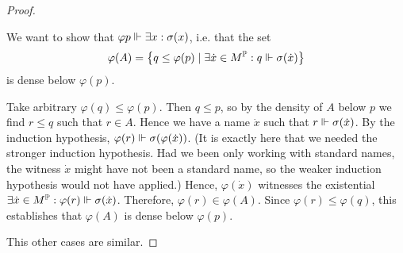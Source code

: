 \documentclass[11pt]{article}
\renewcommand{\P}{\mathbb{P}}
\renewcommand{\phi}{\varphi}
\begin{document}
\begin{proof}
\begin{description}
            We want to show that
            $\phi p \forces \exists x : \sigma(x)$,
            i.e. that the set
            \begin{equation*}
                \phi(A) = \setof{
                    q \leq \phi(p) \sth
                    \exists \dot x \in M^\P :
                    q \forces \sigma(\dot x)
                }
            \end{equation*}
            is dense below $\phi(p)$.

            Take arbitrary $\phi(q) \leq \phi(p)$.
            Then $q \leq p$, so by the density of $A$ below $p$ we find
            $r \leq q$ such that $r \in A$. Hence we have a name $\dot x$ such
            that $r \Vdash \sigma(\dot x)$.
            By the induction hypothesis,
            $\phi(r) \forces \sigma(\phi(\dot x))$.
            (It is exactly here that we needed the stronger induction
            hypothesis.
            Had we been only working with standard names, the witness $\dot x$
            might have not been a standard name, so the weaker induction
            hypothesis would not have applied.)
            Hence, $\phi(\dot x)$ witnesses the existential
            $\exists \dot x \in M^\P : \phi(r) \forces \sigma(\dot x)$.
            Therefore, $\phi(r) \in \phi(A)$.
            Since $\phi(r) \leq \phi(q)$, this establishes that $\phi(A)$ is
            dense below $\phi(p)$.
    \end{description}

    This other cases are similar.
\end{proof}
\end{document}
